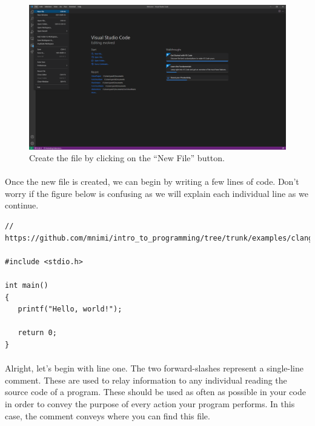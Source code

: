    \begin{figure}[h!]
      \includegraphics[width=\linewidth]{Figure1_VSCODE.png}
      \caption{Create the file by clicking on the ``New File'' button.}
      \label{fig:vscode_newfile}
   \end{figure}

   \paragraph{}
      Once the new file is created, we can begin by writing a few lines of code. Don't worry if the figure below is confusing as we will explain each
      individual line as we continue.

\newpage

\begin{lstlisting}
// https://github.com/mnimi/intro_to_programming/tree/trunk/examples/clang/hello_world/main.c

#include <stdio.h>

int main()
{
   printf("Hello, world!");

   return 0;
}
\end{lstlisting}

\paragraph{}
   Alright, let's begin with line one. The two forward-slashes represent a single-line comment. These are used to relay information to any individual
   reading the source code of a program. These should be used as often as possible in your code in order to convey the purpose of every action your
   program performs. In this case, the comment conveys where you can find this file.

